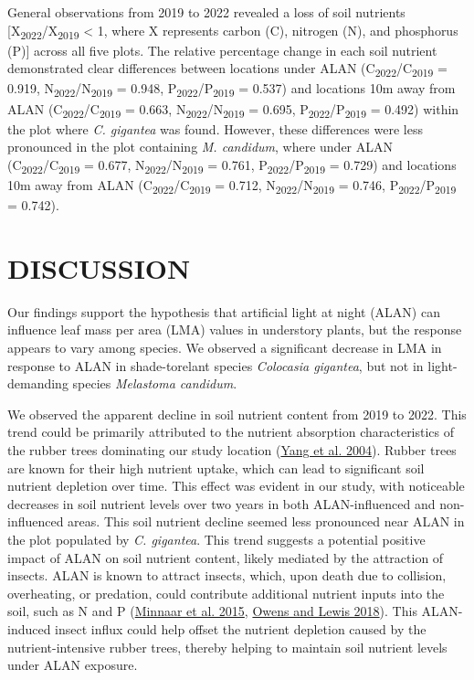 \documentclass[
  12pt,
  letterpaper,
  DIV=11,
  numbers=noendperiod]{scrartcl}
\begin{document}
General observations from 2019 to 2022 revealed a loss of soil nutrients
{[}X\textsubscript{2022}/X\textsubscript{2019} \textless{} 1, where X
represents carbon (C), nitrogen (N), and phosphorus (P){]} across all
five plots. The relative percentage change in each soil nutrient
demonstrated clear differences between locations under ALAN
(C\textsubscript{2022}/C\textsubscript{2019} = 0.919,
N\textsubscript{2022}/N\textsubscript{2019} = 0.948,
P\textsubscript{2022}/P\textsubscript{2019} = 0.537) and locations 10m
away from ALAN (C\textsubscript{2022}/C\textsubscript{2019} = 0.663,
N\textsubscript{2022}/N\textsubscript{2019} = 0.695,
P\textsubscript{2022}/P\textsubscript{2019} = 0.492) within the plot
where \emph{C. gigantea} was found. However, these differences were less
pronounced in the plot containing \emph{M. candidum}, where under ALAN
(C\textsubscript{2022}/C\textsubscript{2019} = 0.677,
N\textsubscript{2022}/N\textsubscript{2019} = 0.761,
P\textsubscript{2022}/P\textsubscript{2019} = 0.729) and locations 10m
away from ALAN (C\textsubscript{2022}/C\textsubscript{2019} = 0.712,
N\textsubscript{2022}/N\textsubscript{2019} = 0.746,
P\textsubscript{2022}/P\textsubscript{2019} = 0.742).

\hypertarget{discussion}{%
\section{DISCUSSION}\label{discussion}}

Our findings support the hypothesis that artificial light at night
(ALAN) can influence leaf mass per area (LMA) values in understory
plants, but the response appears to vary among species. We observed a
significant decrease in LMA in response to ALAN in shade-torelant
species \emph{Colocasia gigantea}, but not in light-demanding species
\emph{Melastoma candidum}.

We observed the apparent decline in soil nutrient content from 2019 to
2022. This trend could be primarily attributed to the nutrient
absorption characteristics of the rubber trees dominating our study
location (\protect\hyperlink{ref-Yang2004}{Yang et al. 2004}). Rubber
trees are known for their high nutrient uptake, which can lead to
significant soil nutrient depletion over time. This effect was evident
in our study, with noticeable decreases in soil nutrient levels over two
years in both ALAN-influenced and non-influenced areas. This soil
nutrient decline seemed less pronounced near ALAN in the plot populated
by \emph{C. gigantea}. This trend suggests a potential positive impact
of ALAN on soil nutrient content, likely mediated by the attraction of
insects. ALAN is known to attract insects, which, upon death due to
collision, overheating, or predation, could contribute additional
nutrient inputs into the soil, such as N and P
(\protect\hyperlink{ref-Minnaar2015}{Minnaar et al. 2015},
\protect\hyperlink{ref-Owens2018}{Owens and Lewis 2018}). This
ALAN-induced insect influx could help offset the nutrient depletion
caused by the nutrient-intensive rubber trees, thereby helping to
maintain soil nutrient levels under ALAN exposure.
\end{document}
